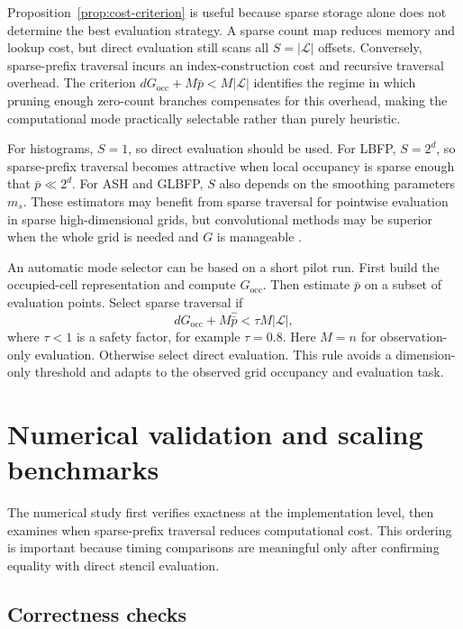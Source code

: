 \documentclass[pdflatex,sn-mathphys-ay]{sn-jnl}
\theoremstyle{thmstyleone}
\newcommand{\stencil}{\mathcal{L}}
\begin{document}
Proposition~\ref{prop:cost-criterion} is useful because sparse storage alone does not determine the best evaluation strategy. A sparse count map reduces memory and lookup cost, but direct evaluation still scans all \(S=|\stencil|\) offsets. Conversely, sparse-prefix traversal incurs an index-construction cost and recursive traversal overhead. The criterion \(dG_{\mathrm{occ}}+M\bar p<M|\stencil|\) identifies the regime in which pruning enough zero-count branches compensates for this overhead, making the computational mode practically selectable rather than purely heuristic.

For histograms, \(S=1\), so direct evaluation should be used. For LBFP, \(S=2^d\), so sparse-prefix traversal becomes attractive when local occupancy is sparse enough that \(\bar p\ll 2^d\). For ASH and GLBFP, \(S\) also depends on the smoothing parameters \(m_s\). These estimators may benefit from sparse traversal for pointwise evaluation in sparse high-dimensional grids, but convolutional methods may be superior when the whole grid is needed and \(G\) is manageable \citep{Silverman1982FFT,Wand1994FastKDE,GramackiGramacki2017}.

An automatic mode selector can be based on a short pilot run. First build the occupied-cell representation and compute \(G_{\mathrm{occ}}\). Then estimate \(\bar p\) on a subset of evaluation points. Select sparse traversal if
\[
dG_{\mathrm{occ}}+M\widehat{\bar p}
<
\tau M|\stencil|,
\]
where \(\tau<1\) is a safety factor, for example \(\tau=0.8\). Here \(M=n\) for observation-only evaluation. Otherwise select direct evaluation. This rule avoids a dimension-only threshold and adapts to the observed grid occupancy and evaluation task.

\section{Numerical validation and scaling benchmarks}
\label{sec:experiments}

The numerical study first verifies exactness at the implementation level, then examines when sparse-prefix traversal reduces computational cost. This ordering is important because timing comparisons are meaningful only after confirming equality with direct stencil evaluation.

\subsection{Correctness checks}
\end{document}
